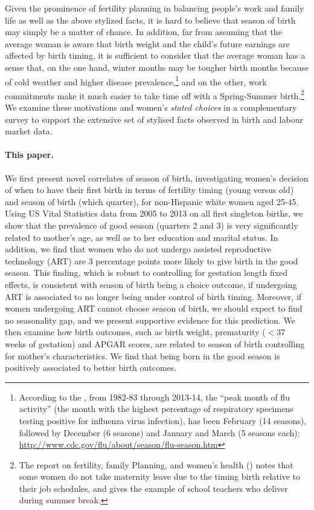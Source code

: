 \documentclass[a4paper, 12 pt]{article}
\theoremstyle{plain}
\begin{document}
\begin{doublespace}
Given the prominence of fertility planning in balancing people's work and family life as well as the above stylized facts, it is hard to believe that season of birth may simply be a matter of chance. In addition, far from assuming that the average woman is aware that birth weight and the child's future earnings are affected by birth timing, it is sufficient to consider that the average woman has a sense that, on the one hand, winter months may be tougher birth months because of cold weather and higher disease prevalence,\footnote{According to the \citet{CDC2014}, from 1982-83 through 2013-14, the ``peak month of flu activity'' (the month with the highest percentage of respiratory specimens testing positive for influenza virus infection), has been February (14 seasons), followed by December (6 seasons) and January and March (5 seasons each): \href{http://www.cdc.gov/flu/about/season/flu-season.htm}{http://www.cdc.gov/flu/about/season/flu-season.htm}} and on the other, work commitments make it much easier to take time off with a Spring-Summer birth.\footnote{The report on fertility, family Planning, and women's health (\citealp{CDC1997}) notes that some women do not take maternity leave due to the timing birth relative to their job schedules, and gives the example of school teachers who deliver during summer break.}  We examine these motivations and women's \emph{stated choices} in a complementary survey to support the extensive set of stylised facts observed in birth and labour market data.

\paragraph{This paper.} We first present novel correlates of season of birth, investigating women's decision of when to have their first birth in terms of fertility timing (young versus old) and season of birth (which quarter), for non-Hispanic white women aged 25-45. Using US Vital Statistics data from 2005 to 2013 on all first singleton births, we show that the prevalence of good season (quarters 2 and 3) is very significantly related to mother's age, as well as to her education and marital status. In addition, we find that women who do not undergo assisted reproductive technology (ART) are 3 percentage points more likely to give birth in the good season. This finding, which is robust to controlling for gestation length fixed effects, is consistent with season of birth being a choice outcome, if undergoing ART is associated to no longer being under control of birth timing. Moreover, if women undergoing ART cannot choose season of birth, we should expect to find no seasonality gap, and we present supportive evidence for this prediction. We then examine how birth outcomes, such as birth weight, prematurity ($<37$ weeks of gestation) and APGAR scores, are related to season of birth controlling for mother's characteristics. We find that being born in the good season is positively associated to better birth outcomes.


\end{doublespace}
\end{document}

